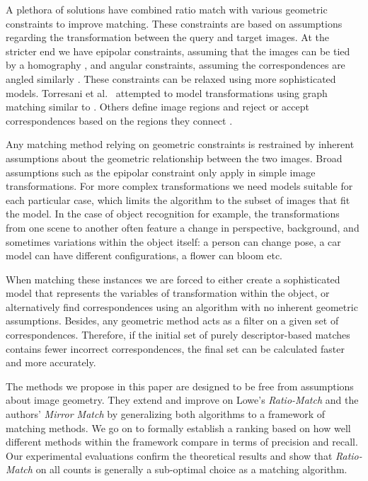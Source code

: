\documentclass[10pt,journal,cspaper,compsoc]{IEEEtran}
\begin{document}
A plethora of solutions have combined ratio match with various geometric 
constraints to improve matching. These constraints are
based on assumptions regarding the transformation between the query and 
target images. At the stricter end we have epipolar constraints, assuming
that the images can be tied by a homography \cite{torr2000mlesac,chum2005matching}, and angular constraints, assuming the 
correspondences are angled similarly \cite{kim2008efficient,schmid1997local,leordeanu2005spectral}. 
These constraints can be relaxed using more sophisticated models.  Torresani et al.\ \cite{torresani2008feature} 
attempted to model transformations using graph matching similar to 
\cite{deriche1994robust}. Others define image regions and reject or 
accept correspondences based on the regions they connect 
\cite{cho2009feature,wu2011robust}.

Any matching method relying on geometric constraints is restrained by 
inherent assumptions about the geometric relationship between the two 
images. Broad assumptions such as the epipolar constraint only apply in 
simple image transformations. For more complex transformations we need 
models suitable for each particular case, which limits the algorithm 
to the subset of images that fit the model.  In the case of object 
recognition for example, the transformations from one scene to another 
often feature a change in perspective, background, and sometimes variations within the object 
itself: a person can change pose, a car model can have different 
configurations, a flower can bloom etc.

When matching these instances we are forced to either create a 
sophisticated model that represents the variables of transformation 
within the object, or alternatively find correspondences using an 
algorithm with no inherent geometric assumptions. Besides, 
any geometric method acts as a filter on a given set of 
correspondences.  Therefore, if the initial set of purely descriptor-based matches contains fewer incorrect correspondences, 
the final set can be calculated faster and more accurately.

The methods we propose in this paper are designed to be free from 
assumptions about image geometry. They extend and improve on Lowe's 
\emph{Ratio-Match} \cite{lowe2004sift} and the authors' \emph{Mirror 
Match} \cite{arnfred2013mirror} by generalizing both algorithms to a 
framework of matching methods. We go on to formally establish a ranking
based on how well different methods within the framework compare in 
terms of precision and recall. Our experimental evaluations confirm the 
theoretical results and show that \emph{Ratio-Match} on all counts is generally a 
sub-optimal choice as a matching algorithm.
\end{document}

